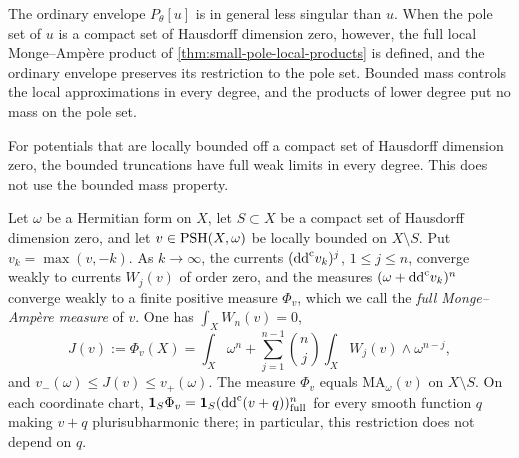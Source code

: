 The ordinary envelope $P_\theta[u]$ is in general less singular than $u$. When the pole set of $u$ is a compact set of Hausdorff dimension zero, however, the full local Monge--Amp\`ere product of \cref{thm:small-pole-local-products} is defined, and the ordinary envelope preserves its restriction to the pole set. Bounded mass controls the local approximations in every degree, and the products of lower degree put no mass on the pole set.

For potentials that are locally bounded off a compact set of Hausdorff dimension zero, the bounded truncations have full weak limits in every degree. This does not use the bounded mass property.

\begin{lemma}\label{lem:small-pole-full-measures}
Let $\omega$ be a Hermitian form on $X$, let $S\subset X$ be a compact set of Hausdorff dimension zero, and let $v\in\mathrm{PSH}(X,\omega)$ be locally bounded on $X\setminus S$. Put $v_k=\max(v,-k)$. As $k\to\infty$, the currents $(\mathrm{dd}^{\mathrm{c}} v_k)^j$, $1\leq j\leq n$, converge weakly to currents $W_j(v)$ of order zero, and the measures $(\omega+\mathrm{dd}^{\mathrm{c}} v_k)^n$ converge weakly to a finite positive measure $\Phi_v$, which we call the \emph{full Monge--Amp\`ere measure} of $v$. One has $\int_XW_n(v)=0$,
\begin{equation}\label{eq:small-pole-full-total}
 J(v):=\Phi_v(X)
 =\int_X\omega^n+
       \sum_{j=1}^{n-1}\binom nj
              \int_XW_j(v)\wedge\omega^{n-j},
\end{equation}
and $v_-(\omega)\leq J(v)\leq v_+(\omega)$. The measure $\Phi_v$ equals $\mathrm{MA}_\omega(v)$ on $X\setminus S$. On each coordinate chart, $\mathbf1_S\Phi_v=\mathbf1_S(\mathrm{dd}^{\mathrm{c}}(v+q))^n_{\mathrm{full}}$ for every smooth function $q$ making $v+q$ plurisubharmonic there; in particular, this restriction does not depend on $q$.
\end{lemma}
